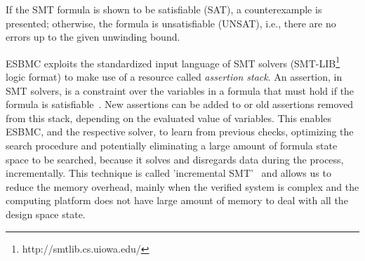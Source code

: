 \documentclass[runningheads]{llncs}
\begin{document}
%
If the SMT formula is shown to be satisfiable (SAT), a counterexample is presented; otherwise, the formula is unsatisfiable (UNSAT), i.e., there are no errors up to the given unwinding bound. 

ESBMC exploits the standardized input language of SMT solvers (SMT-LIB\footnote{http://smtlib.cs.uiowa.edu/} logic format) to make use of a resource called \textit{assertion stack}. An assertion, in SMT solvers, is a constraint over the variables in a formula that must hold if the formula is satisfiable~\cite{Morse2015}. New assertions can be added to or old assertions removed from this stack, depending on the evaluated value of variables. This enables ESBMC, and the respective solver, to learn from previous checks, optimizing the search procedure and potentially eliminating a large amount of formula state space to be searched, because it solves and disregards data during the process, incrementally. This technique is called 'incremental SMT'~\cite{DBLP:journals/fac/SchrammelKBMTB17} and allows us to reduce the memory overhead, mainly when the verified system is complex and the computing platform does not have large amount of memory to deal with all the design space state.
\end{document}
